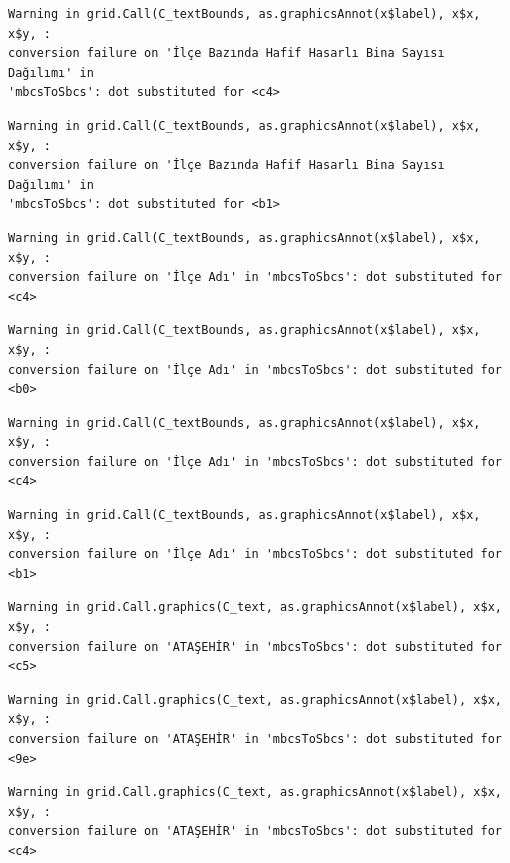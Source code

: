 \documentclass[
  11pt,
  a4paper,
  DIV=11,
  numbers=noendperiod]{scrartcl}
\begin{document}
\begin{verbatim}
Warning in grid.Call(C_textBounds, as.graphicsAnnot(x$label), x$x, x$y, :
conversion failure on 'İlçe Bazında Hafif Hasarlı Bina Sayısı Dağılımı' in
'mbcsToSbcs': dot substituted for <c4>
\end{verbatim}

\begin{verbatim}
Warning in grid.Call(C_textBounds, as.graphicsAnnot(x$label), x$x, x$y, :
conversion failure on 'İlçe Bazında Hafif Hasarlı Bina Sayısı Dağılımı' in
'mbcsToSbcs': dot substituted for <b1>
\end{verbatim}

\begin{verbatim}
Warning in grid.Call(C_textBounds, as.graphicsAnnot(x$label), x$x, x$y, :
conversion failure on 'İlçe Adı' in 'mbcsToSbcs': dot substituted for <c4>
\end{verbatim}

\begin{verbatim}
Warning in grid.Call(C_textBounds, as.graphicsAnnot(x$label), x$x, x$y, :
conversion failure on 'İlçe Adı' in 'mbcsToSbcs': dot substituted for <b0>
\end{verbatim}

\begin{verbatim}
Warning in grid.Call(C_textBounds, as.graphicsAnnot(x$label), x$x, x$y, :
conversion failure on 'İlçe Adı' in 'mbcsToSbcs': dot substituted for <c4>
\end{verbatim}

\begin{verbatim}
Warning in grid.Call(C_textBounds, as.graphicsAnnot(x$label), x$x, x$y, :
conversion failure on 'İlçe Adı' in 'mbcsToSbcs': dot substituted for <b1>
\end{verbatim}

\begin{verbatim}
Warning in grid.Call.graphics(C_text, as.graphicsAnnot(x$label), x$x, x$y, :
conversion failure on 'ATAŞEHİR' in 'mbcsToSbcs': dot substituted for <c5>
\end{verbatim}

\begin{verbatim}
Warning in grid.Call.graphics(C_text, as.graphicsAnnot(x$label), x$x, x$y, :
conversion failure on 'ATAŞEHİR' in 'mbcsToSbcs': dot substituted for <9e>
\end{verbatim}

\begin{verbatim}
Warning in grid.Call.graphics(C_text, as.graphicsAnnot(x$label), x$x, x$y, :
conversion failure on 'ATAŞEHİR' in 'mbcsToSbcs': dot substituted for <c4>
\end{verbatim}
\end{document}
